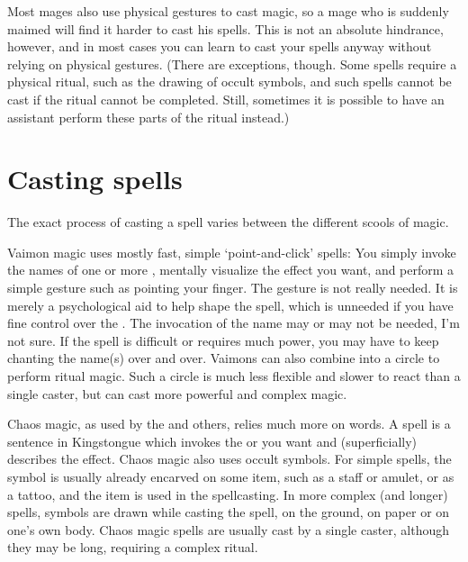 Most mages also use physical gestures to cast magic, so a mage who is suddenly maimed will find it harder to cast his spells. This is not an absolute hindrance, however, and in most cases you can learn to cast your spells anyway without relying on physical gestures. (There are exceptions, though. Some spells require a physical ritual, such as the drawing of occult symbols, and such spells cannot be cast if the ritual cannot be completed. Still, sometimes it is possible to have an assistant perform these parts of the ritual instead.)



\section{Casting spells}
The exact process of casting a spell varies between the different scools of magic. 

Vaimon magic uses mostly fast, simple `point-and-click' spells: You simply invoke the names of one or more \Archons{}, mentally visualize the effect you want, and perform a simple gesture such as pointing your finger. %
The gesture is not really needed. It is merely a psychological aid to help shape the spell, which is unneeded if you have fine control over the \Archons{}. 
The invocation of the name may or may not be needed, I'm not sure. If the spell is difficult or requires much power, you may have to keep chanting the name(s) over and over. 
Vaimons can also combine into a circle to perform ritual magic. Such a circle is much less flexible and slower to react than a single caster, but can cast more powerful and complex magic. 

Chaos magic, as used by the \dragons{} and others, relies much more on words. A spell is a sentence in Kingstongue which invokes the \daemon{} or \daemons{} you want and (superficially) describes the effect. Chaos magic also uses occult symbols. For simple spells, the symbol is usually already encarved on some item, such as a staff or amulet, or as a tattoo, and the item is used in the spellcasting. In more complex (and longer) spells, symbols are drawn while casting the spell, on the ground, on paper or on one's own body. Chaos magic spells are usually cast by a single caster, although they may be long, requiring a complex ritual. 

